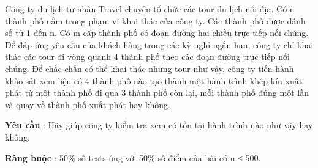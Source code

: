 Công ty du lịch tư nhân Travel chuyên tổ chức các tour du lịch nội địa. Có n thành phố nằm trong phạm vi khai thác của công ty. Các thành phố được đánh số từ 1 đến n. Có m cặp thành phố có đoạn đường hai chiều trực tiếp nối chúng. Để đáp ứng yêu cầu của khách hàng trong các kỳ nghỉ ngắn hạn, công ty chỉ khai thác các tour đi vòng quanh 4 thành phố theo các đoạn đường trực tiếp nối chúng. Để chắc chắn có thể khai thác những tour như vậy, công ty tiến hành khảo sát xem liệu có 4 thành phố nào tạo thành một hành trình khép kín xuất phát từ một thành phố đi qua 3 thành phố còn lại, mỗi thành phố đúng một lần và quay về thành phố xuất phát hay không.

\textbf{Yêu cầu } : Hãy giúp công ty kiểm tra xem có tồn tại hành trình nào như vậy hay không.


\textbf{Ràng buộc } : 50\% số tests ứng với 50\% số điểm của bài có n ≤ 500.